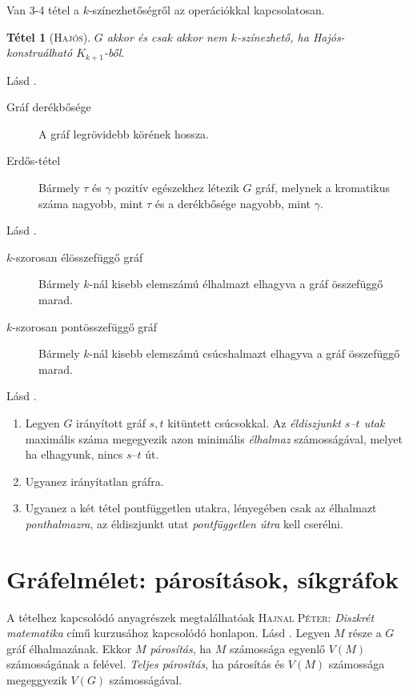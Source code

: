\documentclass[%
	DIV=15,appendixprefix]{scrreprt}
\newtheorem*{tetel}{Tétel}
\theoremstyle{definition}
\theoremstyle{remark}
\begin{document}
Van 3-4 tétel a $k$-színezhetőségről az operációkkal kapcsolatosan.
\begin{tetel}[\textsc{Hajós}]
	$ G $ akkor és csak akkor nem $k$-színezhető, ha Hajós-konstruálható $K_{k+1}$-ből.
\end{tetel}
%
Lásd
\cite[\href{http://www.math.u-szeged.hu/~hajnal/courses/MSc_Diszkret/MSc_kombi13/ea-girth.pdf}{%
\emph{Gráfok csúcsszínezései II.}}]{DiMat}.
\begin{description}
	\item[Gráf derékbősége] A gráf legrövidebb körének hossza.
	\item[Erdős-tétel] Bármely $ \tau $ és $ \gamma $ pozitív egészekhez létezik $G$ gráf, melynek a
		kromatikus száma nagyobb, mint $ \tau $ és a derékbősége nagyobb, mint $ \gamma $.
\end{description}
%
Lásd
\cite[\href{http://www.math.u-szeged.hu/~hajnal/courses/MSc_Diszkret/MSc_kombi13/ea-folyamok.pdf}{%
\emph{Folyamok II. -- Magasabb fokú összefüggőség}}, 18.~oldaltól]{DiMat}.
\begin{description}
	\item[$ k $-szorosan élösszefüggő gráf] Bármely $k$-nál kisebb elemszámú élhalmazt elhagyva
		a gráf összefüggő marad.
	\item[$ k $-szorosan pontösszefüggő gráf] Bármely $k$-nál kisebb elemszámú csúcshalmazt elhagyva
		a gráf összefüggő marad.
\end{description}
%
Lásd
\cite[\href{http://www.math.u-szeged.hu/~hajnal/courses/MSc_Diszkret/MSc_kombi13/ea-folyamok.pdf}{%
\emph{Folyamok I. -- Alaptételek}}, 13--16.~oldal]{DiMat}.
\begin{enumerate}
	\item Legyen $ G $ irányított gráf $s,{}t$ kitüntett csúcsokkal. Az \emph{éldiszjunkt $s$--$t$
		utak} maximális száma megegyezik azon minimális \emph{élhalmaz} számosságával, melyet ha
		elhagyunk, nincs $s$--$t$ út.
	\item Ugyanez irányítatlan gráfra.
	\item Ugyanez a két tétel pontfüggetlen utakra, lényegében csak az élhalmazt
		\emph{ponthalmazra}, az éldiszjunkt utat \emph{pontfüggetlen útra} kell cserélni.
\end{enumerate}
%
\section{Gráfelmélet: párosítások, síkgráfok}
A tételhez kapcsolódó anyagrészek megtalálhatóak \textsc{Hajnal Péter}: \emph{Diszkrét matematika}
\cite{DiMat} című kurzusához kapcsolódó honlapon.
%
Lásd
\cite[\href{http://www.math.u-szeged.hu/~hajnal/courses/MSc_Diszkret/MSc_kombi13/ea-parositasok.pdf}
{\emph{Párosítások I. -- Alapok, nem kombinatorikus módszerek}}, 1.~szakasz]{DiMat}.
Legyen $ M $ része a $G$ gráf élhalmazának. Ekkor $M$ \emph{párosítás}, ha $M$ számossága egyenlő
$ V \left( M \right) $ számosságának a felével. \emph{Teljes párosítás}, ha párosítás és
$ V \left( M \right) $ számossága megeggyezik $ V \left( G \right) $ számosságával.
\end{document}
